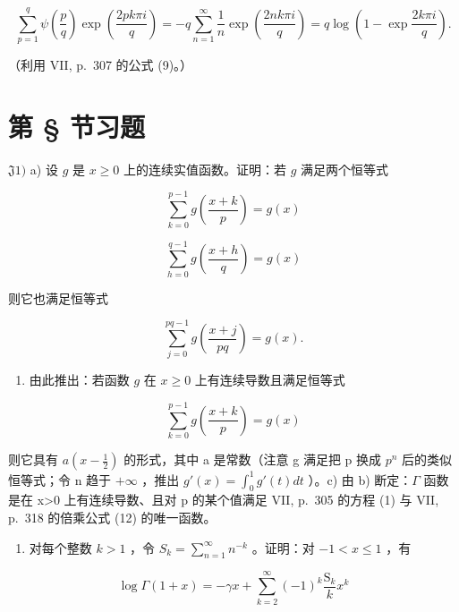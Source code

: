 \[
\sum_ {p = 1} ^ {q} \psi \left(\frac {p}{q}\right) \exp \left(\frac {2 p k \pi i}{q}\right) = - q \sum_ {n = 1} ^ {\infty} \frac {1}{n} \exp \left(\frac {2 n k \pi i}{q}\right) = q \log \left(1 - \exp \frac {2 k \pi i}{q}\right).
\]

（利用 VII, p.~307 的公式 (9)。）

\setcounter{exercisegroup}{1}
\section*{第 \S{} 节习题}
{}

\(\mathfrak{J}1)\) a) 设 \(g\) 是 \(x \geqslant 0\) 上的连续实值函数。证明：若 \(g\) 满足两个恒等式

\[
\sum_ {k = 0} ^ {p - 1} g \left(\frac {x + k}{p}\right) = g (x)
\]

\[
\sum_ {h = 0} ^ {q - 1} g \left(\frac {x + h}{q}\right) = g (x)
\]

则它也满足恒等式

\[
\sum_ {j = 0} ^ {p q - 1} g \left(\frac {x + j}{p q}\right) = g (x).
\]

\begin{enumerate}
\def\labelenumi{\alph{enumi})}
\setcounter{enumi}{1}
\tightlist
\item
  由此推出：若函数 \(g\) 在 \(x \geqslant 0\) 上有连续导数且满足恒等式
\end{enumerate}

\[
\sum_ {k = 0} ^ {p - 1} g \left(\frac {x + k}{p}\right) = g (x)
\]

则它具有 \(a(x-\frac{1}{2})\) 的形式，其中 a 是常数（注意 g 满足把 p 换成 \(p^{n}\) 后的类似恒等式；令 n 趋于 \(+\infty\) ，推出 \(g'(x)=\int_{0}^{1}g'(t)dt\) ）。c) 由 b) 断定：\(\Gamma\) 函数是在 x\textgreater0 上有连续导数、且对 p 的某个值满足 VII, p.~305 的方程 (1) 与 VII, p.~318 的倍乘公式 (12) 的唯一函数。

\begin{enumerate}
\def\labelenumi{\arabic{enumi})}
\setcounter{enumi}{1}
\tightlist
\item
  对每个整数 \(k > 1\) ，令 \(S_k = \sum_{n=1}^{\infty} n^{-k}\) 。证明：对 \(-1 < x \leqslant 1\) ，有
\end{enumerate}

\[
\log \Gamma (1 + x) = - \gamma x + \sum_ {k = 2} ^ {\infty} (- 1) ^ {k} \frac {\mathrm{S} _ {k}}{k} x ^ {k}
\]

